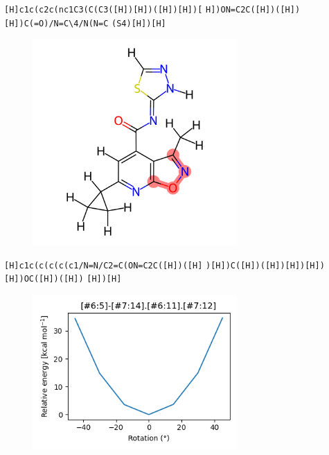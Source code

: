 \documentclass{beamer}
\begin{document}
\begin{frame}[fragile]
\verb|[H]c1c(c2c(nc1C3(C(C3([H])[H])([H])[H])[|
\verb|H])ON=C2C([H])([H])[H])C(=O)/N=C\4/N(N=C|
\verb|(S4)[H])[H]|

\begin{figure}
    \includegraphics[width=0.7\textwidth,height=0.7\textheight,keepaspectratio]{mol12.png}
\end{figure}
\end{frame}
\begin{frame}[fragile]
\verb|[H]c1c(c(c(c(c1/N=N/C2=C(ON=C2C([H])([H]|
\verb|)[H])C([H])([H])[H])[H])[H])OC([H])([H])|
\verb|[H])[H]|

\begin{figure}
    \includegraphics[width=0.7\textwidth,height=0.7\textheight,keepaspectratio]{plot00.png}
\end{figure}
\end{frame}
\end{document}
